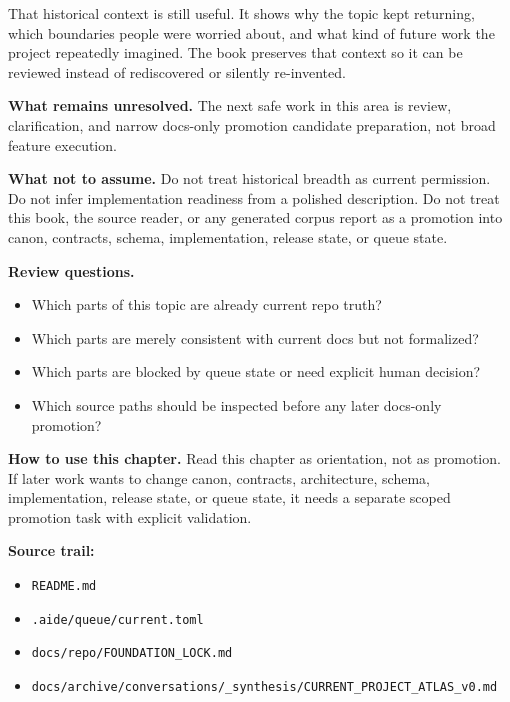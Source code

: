\documentclass[10.5pt,a4paper,openany]{book}
\begin{document}
That historical context is still useful.\allowbreak{} It shows why the topic kept returning, which boundaries people were worried about, and what kind of future work the project repeatedly imagined.\allowbreak{} The book preserves that context so it can be reviewed instead of rediscovered or silently re-\allowbreak{}invented.\allowbreak{}


\textbf{What remains unresolved.} The next safe work in this area is review, clarification, and narrow docs-\allowbreak{}only promotion candidate preparation, not broad feature execution.\allowbreak{}


\textbf{What not to assume.} Do not treat historical breadth as current permission.\allowbreak{} Do not infer implementation readiness from a polished description.\allowbreak{} Do not treat this book, the source reader, or any generated corpus report as a promotion into canon, contracts, schema, implementation, release state, or queue state.\allowbreak{}


\textbf{Review questions.}


\begin{itemize}
\item Which parts of this topic are already current repo truth?
\item Which parts are merely consistent with current docs but not formalized?
\item Which parts are blocked by queue state or need explicit human decision?
\item Which source paths should be inspected before any later docs-\allowbreak{}only promotion?
\end{itemize}

\textbf{How to use this chapter.} Read this chapter as orientation, not as promotion.\allowbreak{} If later work wants to change canon, contracts, architecture, schema, implementation, release state, or queue state, it needs a separate scoped promotion task with explicit validation.\allowbreak{}


\textbf{Source trail:}


\begin{itemize}
\item \texttt{README.\allowbreak{}md}
\item \texttt{.\allowbreak{}aide/\allowbreak{}queue/\allowbreak{}current.\allowbreak{}toml}
\item \texttt{docs/\allowbreak{}repo/\allowbreak{}FOUNDATION\_\allowbreak{}LOCK.\allowbreak{}md}
\item \texttt{docs/\allowbreak{}archive/\allowbreak{}conversations/\allowbreak{}\_\allowbreak{}synthesis/\allowbreak{}CURRENT\_\allowbreak{}PROJECT\_\allowbreak{}ATLAS\_\allowbreak{}v0.\allowbreak{}md}
\end{itemize}
\end{document}
